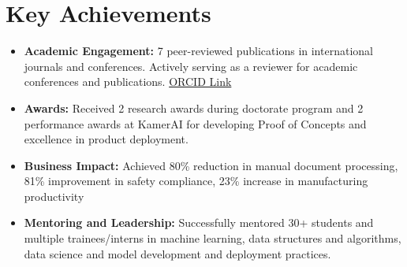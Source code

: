 \documentclass[a4paper,11pt]{article}
\begin{document}
\section{Key Achievements}
  \begin{itemize}[leftmargin=*, itemsep = -4pt]
    \item {\textbf{Academic Engagement: }7 peer-reviewed publications in international journals and conferences. Actively serving as a reviewer for academic conferences and publications. \href{https://orcid.org/0000-0002-2247-9046}{ORCID Link}}
    \item {\textbf{Awards: }Received 2 research awards during doctorate program and 2 performance awards at KamerAI for developing Proof of Concepts and excellence in product deployment.}
    \item{\textbf{Business Impact: }Achieved 80\% reduction in manual document processing, 81\% improvement in safety compliance, 23\% increase in manufacturing productivity}
    \item {\textbf{Mentoring and Leadership: }Successfully mentored 30+ students and multiple trainees/interns in machine learning, data structures and algorithms, data science and model development and deployment practices.}
  \end{itemize}
\end{document}
